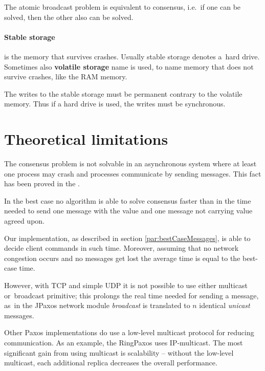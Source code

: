 \noindent The atomic broadcast problem is equivalent to consensus, i.e.\ if one can be solved, then the other also can be solved.

\paragraph{Stable storage}
is the memory that survives crashes. Usually stable storage denotes a~hard drive.
Sometimes also \textbf{volatile storage} name is used, to name memory that does not survive crashes, like the RAM memory.

\noindent The writes to the stable storage must be permanent contrary to the volatile memory. Thus if a hard drive is used, the writes must be synchronous.

\section{Theoretical limitations}


The consensus problem is not solvable in an asynchronous system where at least one process may crash and processes communicate by sending messages. This fact has been proved in the \cite{FLP}.


In the best case no algorithm is able to solve consensus faster than in the time needed to send one message with the value and one message not carrying value agreed upon.

Our implementation, as described in section \ref{par:bestCaseMessages}, is able to decide client commands in such time. Moreover, assuming that no network congestion occurs and no messages get lost the average time is equal to the best-case time.

However, with TCP and simple UDP it is not possible to use either multicast or~broadcast primitive; this prolongs the real time needed for sending a message, as~in the JPaxos network module \emph{broadcast} is translated to $n$ identical \textit{unicast} messages.

Other Paxos implementations do use a low-level multicast protocol for reducing communication. As an example, the RingPaxos \cite{Mar10} uses IP-multicast. The most significant gain from using multicast is scalability -- without the low-level multicast, each additional replica decreases the overall performance.

